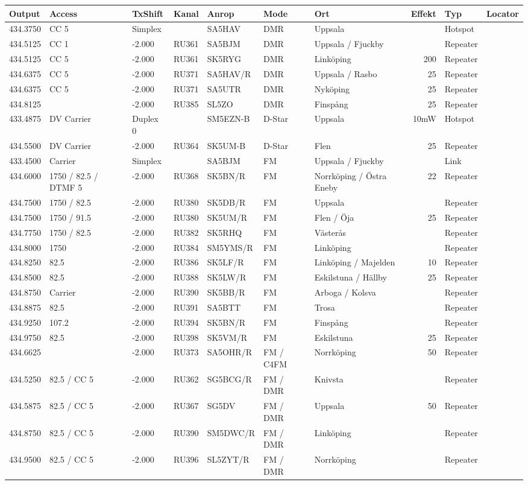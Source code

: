 \begin{longtable}{lllllllrlr}
Output & Access & TxShift & Kanal & Anrop & Mode & Ort & Effekt & Typ & Locator \\ \hline
434.3750&CC 5&Simplex&&SA5HAV&DMR&Uppsala&&Hotspot&\\
434.5125&CC 1&-2.000&RU361&SA5BJM&DMR&Uppsala / Fjuckby&&Repeater&\\
434.5125&CC 5&-2.000&RU361&SK5RYG&DMR&Linköping&200&Repeater&\\
434.6375&CC 5&-2.000&RU371&SA5HAV/R&DMR&Uppsala / Rasbo&25&Repeater&\\
434.6375&CC 5&-2.000&RU371&SA5UTR&DMR&Nyköping&25&Repeater&\\
434.8125&&-2.000&RU385&SL5ZO&DMR&Finspång&25&Repeater&\\
433.4875&DV Carrier&Duplex 0&&SM5EZN-B&D-Star&Uppsala&10mW&Hotspot&\\
434.5500&DV Carrier&-2.000&RU364&SK5UM-B&D-Star&Flen&25&Repeater&\\
433.4500&Carrier&Simplex&&SA5BJM&FM&Uppsala / Fjuckby&&Link&\\
434.6000&1750 / 82.5 / DTMF 5&-2.000&RU368&SK5BN/R&FM&Norrköping / Östra Eneby&22&Repeater&\\
434.7500&1750 / 82.5&-2.000&RU380&SK5DB/R&FM&Uppsala&&Repeater&\\
434.7500&1750 / 91.5&-2.000&RU380&SK5UM/R&FM&Flen / Öja&25&Repeater&\\
434.7750&1750 / 82.5&-2.000&RU382&SK5RHQ&FM&Västerås&&Repeater&\\
434.8000&1750&-2.000&RU384&SM5YMS/R&FM&Linköping&&Repeater&\\
434.8250&82.5&-2.000&RU386&SK5LF/R&FM&Linköping / Majelden&10&Repeater&\\
434.8500&82.5&-2.000&RU388&SK5LW/R&FM&Eskilstuna / Hällby&25&Repeater&\\
434.8750&Carrier&-2.000&RU390&SK5BB/R&FM&Arboga / Kolsva&&Repeater&\\
434.8875&82.5&-2.000&RU391&SA5BTT&FM&Trosa&&Repeater&\\
434.9250&107.2&-2.000&RU394&SK5BN/R&FM&Finspång&&Repeater&\\
434.9750&82.5&-2.000&RU398&SK5VM/R&FM&Eskilstuna&25&Repeater&\\
434.6625&&-2.000&RU373&SA5OHR/R&FM / C4FM&Norrköping&50&Repeater&\\
434.5250&82.5 / CC 5&-2.000&RU362&SG5BCG/R&FM / DMR&Knivsta&&Repeater&\\
434.5875&82.5 / CC 5&-2.000&RU367&SG5DV&FM / DMR&Uppsala&50&Repeater&\\
434.8750&82.5 / CC 5&-2.000&RU390&SM5DWC/R&FM / DMR&Linköping&&Repeater&\\
434.9500&82.5 / CC 5&-2.000&RU396&SL5ZYT/R&FM / DMR&Norrköping&&Repeater&\\
\end{longtable}
\clearpage
